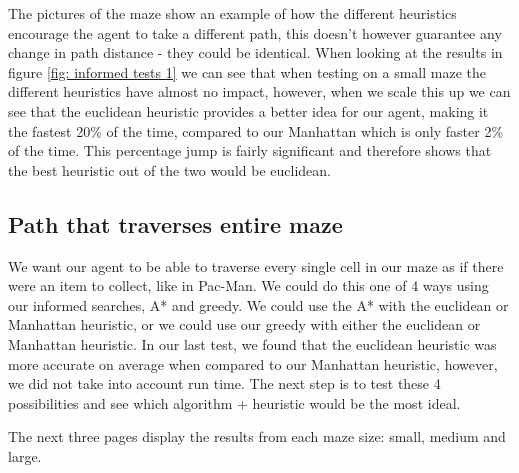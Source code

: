 \documentclass[]{final_report}
\begin{document}
The pictures of the maze show an example of how the different heuristics encourage the agent to take a different path, this doesn't however guarantee any change in path distance - they could be identical. When looking at the results in figure \ref{fig: informed tests 1} we can see that when testing on a small maze the different heuristics have almost no impact, however, when we scale this up we can see that the euclidean heuristic provides a better idea for our agent, making it the fastest 20\% of the time, compared to our Manhattan which is only faster 2\% of the time. This percentage jump is fairly significant and therefore shows that the best heuristic out of the two would be euclidean. 

\subsection{Path that traverses entire maze}

 We want our agent to be able to traverse every single cell in our maze as if there were an item to collect, like in Pac-Man. We could do this one of 4 ways using our informed searches, A* and greedy. We could use the A* with the euclidean or Manhattan heuristic, or we could use our greedy with either the euclidean or Manhattan heuristic. In our last test, we found that the euclidean heuristic was more accurate on average when compared to  our Manhattan heuristic, however, we did not take into account run time. The next step is to test these 4 possibilities and see which algorithm + heuristic would be the most ideal. 

 The next three pages display the results from each maze size: small, medium and large.
\end{document}
